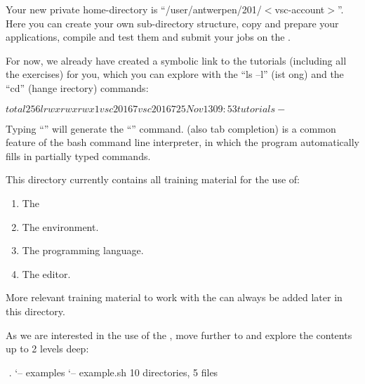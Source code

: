 Your new private home-directory is ``/user/antwerpen/201/$<$vsc-account$>$''.
Here you can create your own sub-directory structure, copy and prepare your
applications, compile and test them and submit your jobs on the \hpc.

For now, we already have created a symbolic link to the tutorials (including
all the exercises) for you, which you can explore with the ``ls --l''
(ist ong) and the ``cd'' (hange
irectory) commands:

\begin{prompt}
$ %
total 256
lrwxrwxrwx 1 vsc20167 vsc20167 25 Nov 13 09:53 tutorials -%
$ %
\end{prompt}

Typing ``'' will generate the
``'' command. (also tab completion) is a common feature of the bash command line
interpreter, in which the program automatically fills in partially typed
commands.


This directory currently contains all training material for the use of:

\begin{enumerate}
\item  The 
\item  The  environment.
\item  The  programming language.
\item  The  editor.
\end{enumerate}

More relevant training material to work with the \hpc can always be added
later in this directory.

As we are interested in the use of the , move
further to  and explore the contents up to 2 levels
deep:

\begin{prompt}
$ %
$ %
.
`-- examples
    `-- example.sh
10 directories, 5 files
\end{prompt}

